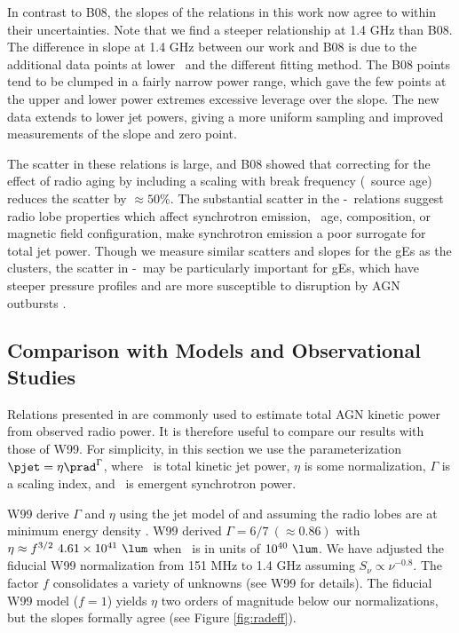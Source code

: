 \documentclass[12pt, preprint]{aastex}
\begin{document}
In contrast to B08, the slopes of the relations in this work now agree
to within their uncertainties. Note that we find a steeper
relationship at 1.4 GHz than B08. The difference in slope at 1.4 GHz
between our work and B08 is due to the additional data points at lower
\pjet\ and the different fitting method. The B08 points tend to be
clumped in a fairly narrow power range, which gave the few points at
the upper and lower power extremes excessive leverage over the
slope. The new data extends to lower jet powers, giving a more uniform
sampling and improved measurements of the slope and zero point.

The scatter in these relations is large, and B08 showed that
correcting for the effect of radio aging by including a scaling with
break frequency (\ie\ source age) reduces the scatter by $\approx
50\%$. The substantial scatter in the \pjet-\prad\ relations suggest
radio lobe properties which affect synchrotron emission, \eg\ age,
composition, or magnetic field configuration, make synchrotron
emission a poor surrogate for total jet power. Though we measure
similar scatters and slopes for the gEs as the clusters, the scatter
in \pjet-\prad\ may be particularly important for gEs, which have
steeper pressure profiles and are more susceptible to disruption by
AGN outbursts \citep{2006MNRAS.372.1161W, 2008ApJ...687L..53P}.

\subsection{Comparison with Models and Observational Studies}
\label{sec:models}

Relations presented in \citet[][hereafter W99]{w99} are commonly used
to estimate total AGN kinetic power from observed radio power. It is
therefore useful to compare our results with those of W99. For
simplicity, in this section we use the parameterization $\pjet = \eta
\prad^{\Gamma}$, where \pjet\ is total kinetic jet power, $\eta$ is
some normalization, $\Gamma$ is a scaling index, and \prad\ is
emergent synchrotron power.

W99 derive $\Gamma$ and $\eta$ using the jet model of
\citet{1991MNRAS.250..581F} and assuming the radio lobes are at
minimum energy density \citep[see][for
  details]{1980ARA&A..18..165M}. W99 derived $\Gamma = 6/7 ~(\approx
0.86)$ with $\eta \approx f^{3/2}~4.61 \times 10^{41} ~\lum$ when
\prad\ is in units of $10^{40} ~\lum$. We have adjusted the fiducial
W99 normalization from 151 MHz to 1.4 GHz assuming $S_{\nu} \propto
\nu^{-0.8}$. The factor $f$ consolidates a variety of unknowns (see
W99 for details). The fiducial W99 model ($f=1$) yields $\eta$ two
orders of magnitude below our normalizations, but the slopes formally
agree (see Figure \ref{fig:radeff}).
\end{document}
